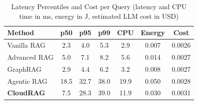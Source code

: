 \begin{table}[!htbp]
\centering
\caption{Latency Percentiles and Cost per Query (latency and CPU time in ms, energy in J, estimated LLM cost in USD)}
\label{tab:latency}
\footnotesize
\begin{tabular*}{\columnwidth}{@{\extracolsep{\fill}}lcccccc@{}}
\toprule
Method & p50 & p95 & p99 & CPU & Energy & Cost \\
\midrule
Vanilla RAG & 2.3 & 4.0 & 5.3 & 2.9 & 0.007 & 0.0026 \\
Advanced RAG & 5.0 & 7.1 & 8.2 & 5.6 & 0.014 & 0.0027 \\
GraphRAG & 2.9 & 4.4 & 6.2 & 3.2 & 0.008 & 0.0027 \\
Agentic RAG & 18.5 & 32.7 & 38.0 & 19.9 & 0.050 & 0.0028 \\
\textbf{CloudRAG} & 7.5 & 28.3 & 39.0 & 11.9 & 0.030 & 0.0031 \\
\bottomrule
\end{tabular*}
\end{table}

